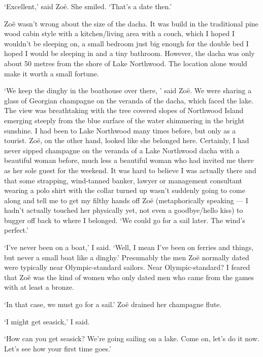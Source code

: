 `Excellent,' said Zoë. She smiled. `That's a date then.'

Zoë wasn't wrong about the size of the dacha. It was build in
the traditional pine wood cabin style with a kitchen/living area
with a couch, which I hoped I wouldn't be sleeping on, a small
bedroom just big enough for the double bed I hoped I would be
sleeping in and a tiny bathroom. However, the dacha was only about
50 metres from the shore of Lake Northwood. The location alone would
make it worth a small fortune.

`We keep the dinghy in the boathouse over there, ' said Zoë. We
were sharing a glass of Georgian champagne on the veranda of the
dacha, which faced the lake. The view was breathtaking with the tree
covered slopes of Northwood Island emerging steeply from the blue
surface of the water shimmering in the bright sunshine. I had been
to Lake Northwood many times before, but only as a tourist. Zoë,
on the other hand, looked like she belonged here. Certainly, I had
never sipped champagne on the veranda of a Lake Northwood dacha with
a beautiful woman before, much less a beautiful woman who had
invited me there as her sole guest for the weekend. It was hard to
believe I was actually there and that some strapping, wind-tanned
banker, lawyer or management consultant wearing a polo shirt with
the collar turned up wasn't suddenly going to come along and tell me
to get my filthy hands off Zoë (metaphorically speaking --- I
hadn't actually touched her physically yet, not even a goodbye/hello kiss) to bugger off back to where
I belonged. `We could go for a sail later. The wind's perfect.'

`I've never been on a boat,' I said. `Well, I mean I've been on
ferries and things, but never a small boat like a dinghy.'
Presumably the men Zoë normally dated were typically near
Olympic-standard sailors. Near Olympic-standard? I feared that
Zoë was the kind of women who only dated men who came from the
games with at least a bronze.

`In that case, we must go for a sail.' Zoë drained her champagne
flute.

`I might get seasick,' I said.

`How can you get seasick? We're going sailing on a lake. Come on,
let's do it now. Let's see how your first time goes.'

